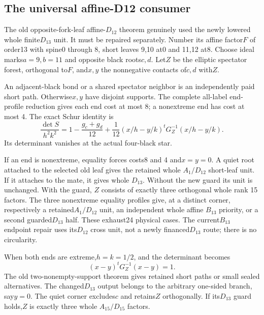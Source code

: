 \documentclass[11pt]{article}
\theoremstyle{remark}\newtheorem{remark}[theorem]{Remark}
\begin{document}
\subsection{The universal affine-D12 consumer}
The old opposite-fork-leaf affine-$D_{12}$ theorem genuinely used the
newly lowered whole finite$D_{13}$ unit. It must be repaired separately.
Number its affine factor$F$ of order13 with spine0 through 8, short leaves
9,10 at0 and 11,12 at8. Choose ideal marks$a=9,b=11$ and opposite black
roots$c,d$. Let$Z$ be the elliptic spectator forest, orthogonal to$F$,
and$x,y$ the nonnegative contacts of$c,d$ with$Z$.

An adjacent-black bond or a shared spectator neighbor is an independently
paid short path. Otherwise$x,y$ have disjoint supports. The complete
all-label end-profile reduction gives each end cost at most 8; a
nonextreme end has cost at most 4. The exact Schur identity is
\[
 \frac{\det S}{h^2k^2}
 =1-\frac{g_c+g_d}{12}
  +\frac1{12}(x/h-y/k)^tG_Z^{-1}(x/h-y/k).
\]
Its determinant vanishes at the actual four-black star.

If an end is nonextreme, equality forces costs8 and 4 and$x=y=0$.
A quiet root attached to the selected old leaf gives the retained whole
$A_1/D_{12}$ short-leaf unit. If it attaches to the mate, it gives whole
$D_{13}$. Without the new guard its unit is unchanged. With the guard,
$Z$ consists of exactly three orthogonal whole rank 15 factors.
The three nonextreme equality profiles give, at a distinct corner,
respectively a retained$A_1/D_{12}$ unit, an independent whole affine
$B_{13}$ priority, or a second guarded$D_{13}$ half. These exhaust24
physical cases. The current$B_{13}$ endpoint repair uses its$D_{12}$
cross unit, not a newly financed$D_{13}$ route; there is no circularity.

When both ends are extreme,$h=k=1/2$, and the determinant becomes
\begin{equation}\label{eq:energyone}
 (x-y)^tG_Z^{-1}(x-y)=1.
\end{equation}
The old two-nonempty-support theorem gives retained short paths or small
sealed alternatives. The changed$D_{13}$ output belongs to the arbitrary
one-sided branch, say$y=0$. The quiet corner excludes$c$ and retains$Z$
orthogonally. If its$D_{13}$ guard holds,$Z$ is exactly three whole
$A_{15}/D_{15}$ factors.
\end{document}
